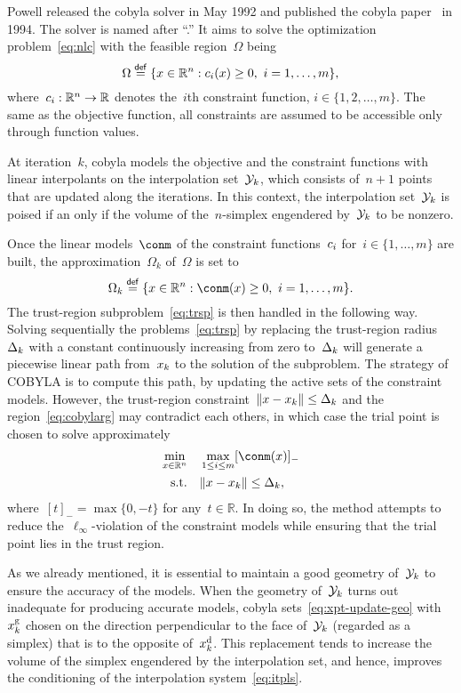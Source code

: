 \documentclass[
    smallextended,  %
    draft,          %
]{svjour3}
\newcommand{\R}{\mathbb{R}}
\newcommand{\con}[1][i]{c\ifthenelse{\equal{#1}{}}{}{_{#1}}}
\newcommand{\drop}{{\text{d}}}
\newcommand{\eqdef}{\mathrel{\stackrel{\mathsf{def}}{=}}}
\newcommand{\fsetm}[1][k]{\Omega_{#1}}
\newcommand{\fset}{\Omega}
\newcommand{\geo}{{\text{g}}}
\newcommand{\iter}[1][k]{x\ifthenelse{\equal{#1}{}}{}{_{#1}}}
\newcommand{\norm}[2][]{#1\lVert#2#1\rVert}
\newcommand{\rad}[1][k]{\Delta\ifthenelse{\equal{#1}{}}{}{_{#1}}}
\newcommand{\set}[2][]{#1\{#2#1\}}
\newcommand{\st}{\text{s.t.}}
\newcommand{\xpt}[1][k]{\mathcal{Y}\ifthenelse{\equal{#1}{}}{}{_{#1}}}
\begin{document}
Powell released the \gls{cobyla} solver in May 1992 and published the \gls{cobyla} paper~\cite{Powell_1994} in 1994.
The solver is named after ``.''
It aims to solve the optimization problem~\eqref{eq:nlc} with the feasible region~$\fset$ being
\begin{equation*}
    \fset \eqdef \set{x \in \R^n : \con(x) \ge 0, ~ i = 1, \dots, m},
\end{equation*}
where~$\con : \R^n \to \R$ denotes the~$i$th constraint function, $i \in \set{1, 2, \dots, m}$.
The same as the objective function, all constraints are assumed to be accessible only through function values.

At iteration~$k$, \gls{cobyla} models the objective and the constraint functions with {linear} interpolants on the interpolation set~$\xpt$, which consists of~$n + 1$ points that are updated along the iterations.
In this context, the interpolation set~$\xpt$ is poised if an only if the volume of the~$n$-simplex engendered by~$\xpt$ to be nonzero.

Once the linear models~$\conm$ of the constraint functions~$\con$ for~$i \in \set{1, \dots, m}$ are built, the approximation~$\fsetm$ of~$\fset$ is set to
\begin{equation}
    \label{eq:cobylarg}
    \fsetm \eqdef \set{x \in \R^n : \conm(x) \ge 0, ~ i=1, \dots, m}.
\end{equation}
The trust-region subproblem~\eqref{eq:trsp} is then handled in the following way.
Solving sequentially the problems~\eqref{eq:trsp} by replacing the trust-region radius~$\rad$ with a constant continuously increasing from zero to~$\rad$ will generate a piecewise linear path from~$\iter$ to the solution of the subproblem.
The strategy of COBYLA is to compute this path, by updating the active sets of the constraint models.
However, the trust-region constraint~$\norm{x - \iter} \le \rad$ and the region~\eqref{eq:cobylarg} may contradict each others, in which case the trial point is chosen to solve approximately
\begin{align*}
    \min_{x \in \R^n}   & \quad \max_{1 \le i \le m} [\conm(x)]_{-}\\
    \st                 & \quad \norm{x - \iter} \le \rad,
\end{align*}
where~$[t]_{-} = \max \set{0, -t}$ for any~$t\in \R$.
In doing so, the method attempts to reduce the~$\ell_\infty$-violation of the constraint models while ensuring that the trial point lies in the trust region.

As we already mentioned, it is essential to maintain a good geometry of~$\xpt$ to ensure the accuracy of the models.
When the geometry of~$\xpt$ turns out inadequate for producing accurate models, \gls{cobyla} sets~\eqref{eq:xpt-update-geo} with~$\iter^{\geo}$ chosen on the direction perpendicular to the face of~$\xpt$ (regarded as a simplex) that is to the opposite of~$\iter^{\drop}$.
This replacement tends to increase the volume of the simplex engendered by the interpolation set, and hence, improves the conditioning of the interpolation system~\eqref{eq:itpls}.
\end{document}
